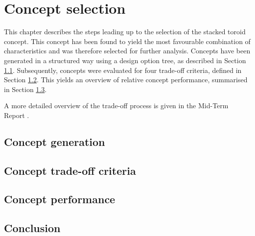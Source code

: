 \section{Concept selection}\label{cha:conceptselection}
This chapter describes the steps leading up to the selection of the stacked toroid concept. This concept has been found to yield the most favourable combination of characteristics and was therefore selected for further analysis. Concepts have been generated in a structured way using a design option tree, as described in Section \ref{sec:conceptgen}. Subsequently, concepts were evaluated for four trade-off criteria, defined in Section \ref{sec:conceptcriteria}. This yields an overview of relative concept performance, summarised in Section \ref{sec:conceptperf}.


A more detailed overview of the trade-off process is given in the Mid-Term Report \cite{Balasooriyan2015b}.

\subsection{Concept generation} \label{sec:conceptgen}


\subsection{Concept trade-off criteria} \label{sec:conceptcriteria}


\subsection{Concept performance} \label{sec:conceptperf}


\subsection{Conclusion} \label{sec:concept_conclusion}


